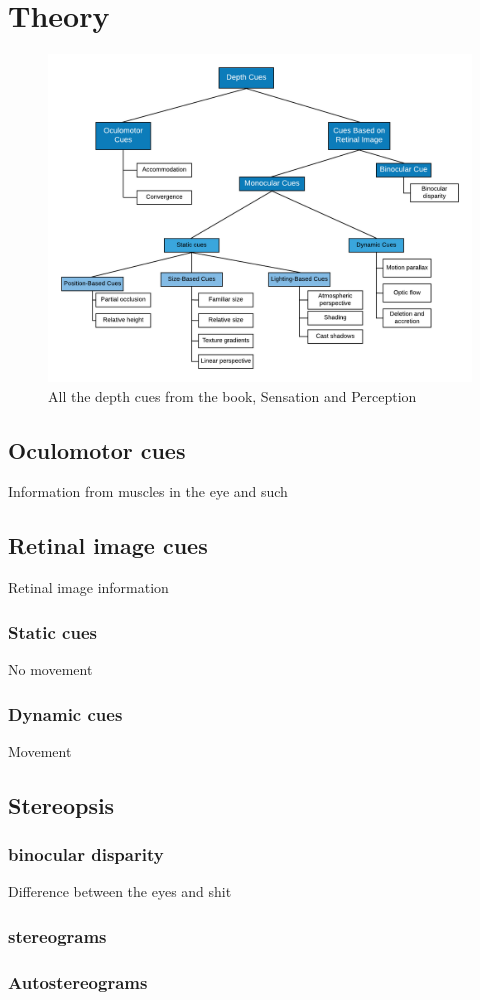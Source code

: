 \chapter{Theory}
	\begin{figure}[H]
		\centering
		\includegraphics[width=1\linewidth]{figure/depthcues}
		\caption{All the depth cues from the book, Sensation and Perception\citep{sensationPerception}}
		\label{fig:depthCues}
	\end{figure}
	\section{Oculomotor cues}
		Information from muscles in the eye and such
	\section{Retinal image cues}
		Retinal image information
		\subsection{Static cues}
			No movement
		\subsection{Dynamic cues}
			Movement
	\section{Stereopsis}
		
		\subsection{binocular disparity}
		Difference between the eyes and shit
		
		\subsection*{stereograms}
		
		\subsection*{Autostereograms}